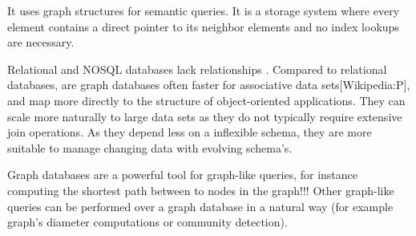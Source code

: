 It uses graph structures for semantic queries. It is a storage system where every element contains a direct pointer to its neighbor elements and no index lookups are necessary. 

\par %

Relational and NOSQL databases lack relationships \citep{robinson13}. Compared to relational databases, are graph databases often faster for associative data sets[Wikipedia:P], and map more directly to the structure of object-oriented applications. They can scale more naturally to large data sets as they do not typically require extensive join operations. As they depend less on a inflexible schema, they are more suitable to manage changing data with evolving schema's.

\par
Graph databases are a powerful tool for graph-like queries, for instance computing the shortest path between to nodes in the graph!!! Other graph-like queries can be performed over a graph database in a natural way (for example graph's diameter computations or community detection).


\par

